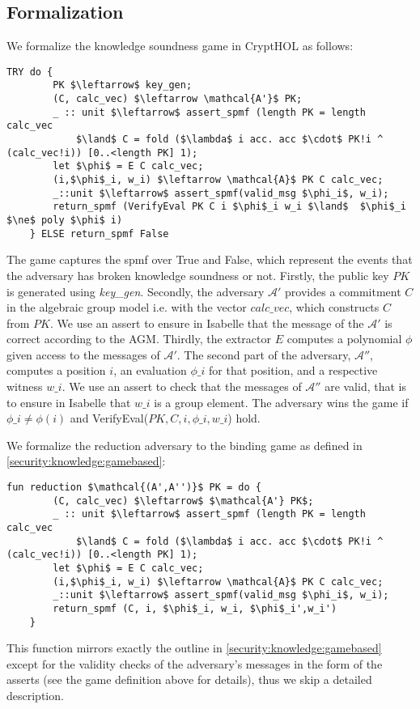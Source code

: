 \subsection*{Formalization}
We formalize the knowledge soundness game in CryptHOL as follows: 
\begin{lstlisting}[language=isabelle]
    TRY do {
        PK $\leftarrow$ key_gen;
        (C, calc_vec) $\leftarrow \mathcal{A'}$ PK;
        _ :: unit $\leftarrow$ assert_spmf (length PK = length calc_vec 
            $\land$ C = fold ($\lambda$ i acc. acc $\cdot$ PK!i ^ (calc_vec!i)) [0..<length PK] 1);
        let $\phi$ = E C calc_vec;
        (i,$\phi$_i, w_i) $\leftarrow \mathcal{A}$ PK C calc_vec;
        _::unit $\leftarrow$ assert_spmf(valid_msg $\phi_i$, w_i);
        return_spmf (VerifyEval PK C i $\phi$_i w_i $\land$  $\phi$_i $\ne$ poly $\phi$ i)
    } ELSE return_spmf False
\end{lstlisting}
The game captures the spmf over True and False, which represent the events that the adversary has broken knowledge soundness or not.
Firstly, the public key $PK$ is generated using \textit{key\_gen}. 
Secondly, the adversary $\mathcal{A'}$ provides a commitment $C$ in the algebraic group model i.e. with the vector $calc\_vec$, which constructs $C$ from $PK$. We use an assert to ensure in Isabelle that the message of the $\mathcal{A'}$ is correct according to the AGM.
Thirdly, the extractor $E$ computes a polynomial $\phi$ given access to the messages of $\mathcal{A'}$. The second part of the adversary, $\mathcal{A''}$, computes a position $i$, an evaluation $\phi\_i$ for that position, and a respective witness $w\_i$. We use an assert to check that the messages of $\mathcal{A''}$ are valid, that is to ensure in Isabelle that $w\_i$ is a group element.
The adversary wins the game if $\phi\_i \ne \phi(i)$ and VerifyEval($PK,C,i,\phi\_i,w\_i$) hold.

We formalize the reduction adversary to the binding game as defined in \ref{security:knowledge:gamebased}: 
\begin{lstlisting}[language=isabelle]
    fun reduction $\mathcal{(A',A'')}$ PK = do {
        (C, calc_vec) $\leftarrow$ $\mathcal{A'} PK$;
        _ :: unit $\leftarrow$ assert_spmf (length PK = length calc_vec 
            $\land$ C = fold ($\lambda$ i acc. acc $\cdot$ PK!i ^ (calc_vec!i)) [0..<length PK] 1);
        let $\phi$ = E C calc_vec;
        (i,$\phi$_i, w_i) $\leftarrow \mathcal{A}$ PK C calc_vec;
        _::unit $\leftarrow$ assert_spmf(valid_msg $\phi_i$, w_i);
        return_spmf (C, i, $\phi$_i, w_i, $\phi$_i',w_i')
    }
\end{lstlisting}
This function mirrors exactly the outline in \ref{security:knowledge:gamebased} except for the validity checks of the adversary's messages in the form of the asserts (see the game definition above for details), thus we skip a detailed description. 